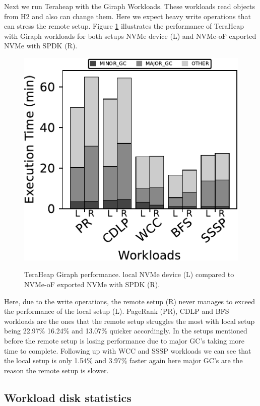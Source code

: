 {\par Next we run Teraheap with the Giraph Workloads. These workloads read objects from H2 and also can change them. Here we expect heavy write operations that can stress the remote setup. Figure \ref{fig:bench_giraph} illustrates the performance of TeraHeap with Giraph workloads for both setups NVMe device (L) and NVMe-oF exported NVMe with SPDK (R).
\begin{figure}[H]
  \includegraphics[width=\linewidth]{figures/bench_giraph.pdf}\\
\caption{TeraHeap Giraph performance. local NVMe device (L) compared to NVMe-oF exported NVMe with SPDK (R).}
\label{fig:bench_giraph}
\end{figure}
Here, due to the write operations, the remote setup (R) never manages to exceed the performance of the local setup (L). PageRank (PR), CDLP and BFS workloads are the ones that the remote setup struggles the most with local setup being 22.97\% 16.24\% and 13.07\% quicker accordingly. In the setups mentioned before the remote setup is losing performance due to major GC's taking more time to complete. Following up with WCC and SSSP workloads we can see that the local setup is only 1.54\%	and 3.97\% faster again here major GC's are the reason the remote setup is slower.

\subsection{Workload disk statistics}

}
